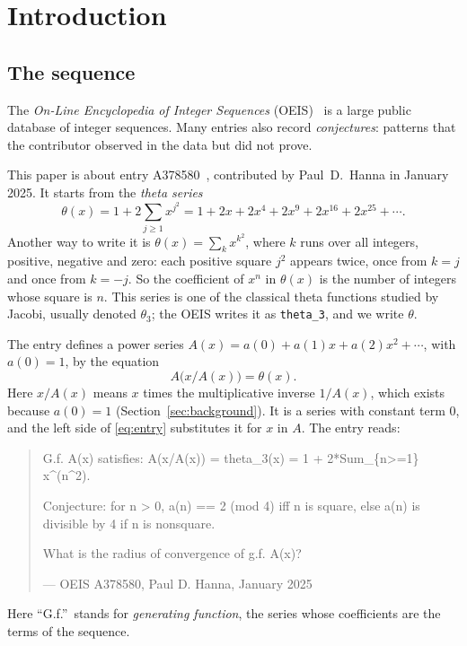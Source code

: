 \documentclass[11pt,a4paper]{article}
\theoremstyle{definition}
\theoremstyle{remark}
\begin{document}
\section{Introduction}

\subsection{The sequence}\label{sec:sequence}
The \emph{On-Line Encyclopedia of Integer Sequences} (OEIS)~\cite{oeisdb} is a large public database of integer
sequences. Many
entries also record \emph{conjectures}: patterns that the contributor observed in the data but did not prove.

This paper is about entry A378580~\cite{oeis}, contributed by Paul~D.~Hanna in January 2025. It starts from the
\emph{theta series}
\[
\theta(x)=1+2\sum_{j\ge1}x^{j^2}=1+2x+2x^4+2x^9+2x^{16}+2x^{25}+\cdots .
\]
Another way to write it is $\theta(x)=\sum_{k}x^{k^2}$, where $k$ runs over all integers, positive, negative and zero:
each positive square $j^2$ appears twice, once from $k=j$ and once from $k=-j$. So the coefficient of $x^n$ in
$\theta(x)$ is the number of integers whose square is $n$. This series is one of the classical theta functions studied
by Jacobi, usually denoted $\theta_3$; the OEIS writes it as \texttt{theta\_3}, and we write $\theta$.

The entry defines a power series $A(x)=a(0)+a(1)x+a(2)x^2+\cdots$, with $a(0)=1$, by the equation
\begin{equation}\label{eq:entry}
A\bigl(x/A(x)\bigr)=\theta(x) .
\end{equation}
Here $x/A(x)$ means $x$ times the multiplicative inverse $1/A(x)$, which exists because $a(0)=1$
(Section~\ref{sec:background}). It is a series with constant term $0$, and the left side of \eqref{eq:entry} substitutes
it for $x$ in $A$. The entry reads:
\begin{quote}\small\ttfamily\raggedright G.f. A(x) satisfies: A(x/A(x)) = theta\_3(x) = 1 + 2*Sum\_\{n>=1\} x\^{}(n\^{}2).\par\smallskip Conjecture: for n > 0, a(n) == 2 (mod 4) iff n is square, else a(n) is divisible by 4 if n is nonsquare.\par\smallskip What is the radius of convergence of g.f. A(x)?\par\smallskip\hfill\textrm{--- OEIS A378580, Paul D. Hanna, January 2025}\end{quote}

Here ``G.f.''\ stands for \emph{generating function}, the series whose coefficients are the terms of the sequence.
\end{document}
